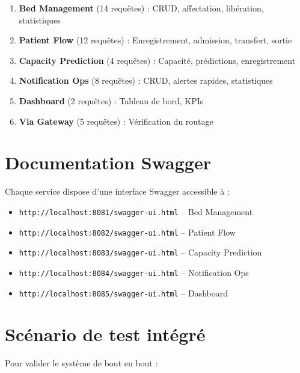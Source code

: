 \documentclass[12pt,a4paper]{report}
\begin{document}
\begin{enumerate}
    \item \textbf{Bed Management} (14 requ\^etes) : CRUD, affectation, lib\'eration, statistiques
    \item \textbf{Patient Flow} (12 requ\^etes) : Enregistrement, admission, transfert, sortie
    \item \textbf{Capacity Prediction} (4 requ\^etes) : Capacit\'e, pr\'edictions, enregistrement
    \item \textbf{Notification Ops} (8 requ\^etes) : CRUD, alertes rapides, statistiques
    \item \textbf{Dashboard} (2 requ\^etes) : Tableau de bord, KPIs
    \item \textbf{Via Gateway} (5 requ\^etes) : V\'erification du routage
\end{enumerate}

\section{Documentation Swagger}

Chaque service dispose d'une interface Swagger accessible \`a :
\begin{itemize}
    \item \texttt{http://localhost:8081/swagger-ui.html} -- Bed Management
    \item \texttt{http://localhost:8082/swagger-ui.html} -- Patient Flow
    \item \texttt{http://localhost:8083/swagger-ui.html} -- Capacity Prediction
    \item \texttt{http://localhost:8084/swagger-ui.html} -- Notification Ops
    \item \texttt{http://localhost:8085/swagger-ui.html} -- Dashboard
\end{itemize}

\section{Sc\'enario de test int\'egr\'e}

Pour valider le syst\`eme de bout en bout :
\end{document}
